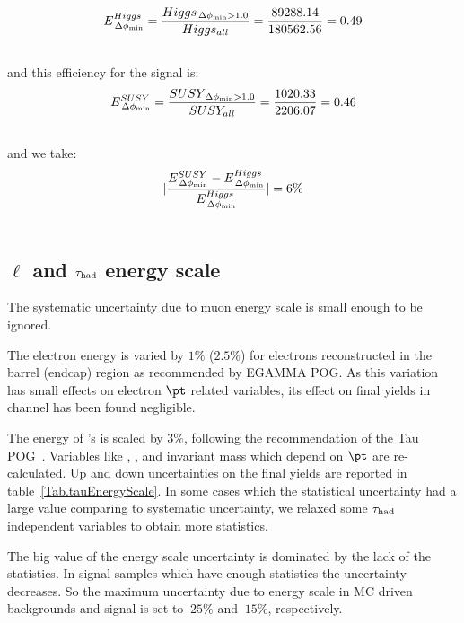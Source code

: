 \begin{align}
E^{Higgs}_{\,{\Delta\phi_{\rm min}}} &= \frac{Higgs_{\,{\Delta\phi_{\rm min}}>1.0}}{Higgs_{all}} = \frac{89288.14}{180562.56} = 0.49 \\ \nonumber
\end{align}
and this efficiency for the signal is: 
\begin{align}
E^{SUSY}_{\,{\Delta\phi_{\rm min}}} &= \frac{SUSY_{\,{\Delta\phi_{\rm min}}>1.0}}{SUSY_{all}} = \frac{1020.33}{2206.07} = 0.46 \\ \nonumber
\end{align}
and we take:
\begin{align}
|\frac{E^{SUSY}_{\,{\Delta\phi_{\rm min}}}-E^{Higgs}_{\,{\Delta\phi_{\rm min}}}}{E^{Higgs}_{\,{\Delta\phi_{\rm min}}}}| &= 6 \% \\ \nonumber
\end{align}

\subsection{\texorpdfstring{$\ell$ and $\tau_{\rm had}$ energy scale}{Energy scale}}

The systematic uncertainty due to muon energy scale is small enough to be ignored.

The electron energy is varied by $1\%$ ($2.5\%$) for electrons reconstructed in the barrel (endcap) region as recommended by EGAMMA POG\cite{eEnergyScale}. As this variation has small effects on electron $\pt$ related variables, its effect on final yields in \eTau channel has been found negligible.

The energy of \hadtau's is scaled by $3\%$, following the recommendation of the Tau POG~\cite{TauPOG}. Variables like \MET, \mttwo, \mindphifour and invariant mass which depend on \hadtau $\pt$ are re-calculated.  Up and down uncertainties on the final yields are reported in table~\ref{Tab.tauEnergyScale}. In some cases which the statistical uncertainty had a large value comparing to systematic uncertainty, we relaxed some $\tau_{\rm had}$ \pt  independent variables to obtain more statistics.

The big value of the \hadtau energy scale uncertainty is dominated by the lack of the statistics. In signal samples which have enough statistics the uncertainty decreases. So the maximum uncertainty due to \hadtau energy scale in MC driven backgrounds and signal is set to $~25\%$ and $~15\%$, respectively.




